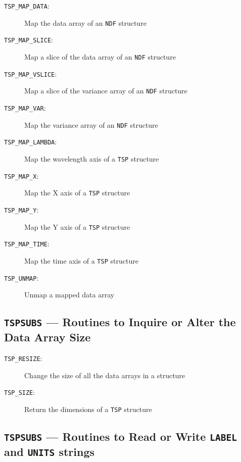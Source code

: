 \documentclass[11pt,twoside,nolof,noabs]{starlink}
\newcommand{\mansection}[2]{\subsection{#1 --- #2}}
\newenvironment{mansectionroutines}{\begin{description}}{\end{description}}
\newcommand{\mansectionitem}[1]{\item[#1:]}
\providecommand{\mantt}[1]{\texttt{#1}}
\begin{document}
\begin{mansectionroutines}
\mansectionitem{{\mantt{TSP\_{}MAP\_{}DATA}}}
     Map the data array of an {\mantt{NDF}} structure

\mansectionitem{{\mantt{TSP\_{}MAP\_{}SLICE}}}
     Map a slice of the data array of an {\mantt{NDF}} structure

\mansectionitem{{\mantt{TSP\_{}MAP\_{}VSLICE}}}
     Map a slice of the variance array of an {\mantt{NDF}} structure

\mansectionitem{{\mantt{TSP\_{}MAP\_{}VAR}}}
     Map the variance array of an {\mantt{NDF}} structure

\mansectionitem{{\mantt{TSP\_{}MAP\_{}LAMBDA}}}
     Map the wavelength axis of a {\mantt{TSP}} structure

\mansectionitem{{\mantt{TSP\_{}MAP\_{}X}}}
     Map the X axis of a {\mantt{TSP}} structure

\mansectionitem{{\mantt{TSP\_{}MAP\_{}Y}}}
     Map the Y axis of a {\mantt{TSP}} structure

\mansectionitem{{\mantt{TSP\_{}MAP\_{}TIME}}}
     Map the time axis of a {\mantt{TSP}} structure

\mansectionitem{{\mantt{TSP\_{}UNMAP}}}
     Unmap a mapped data array

\end{mansectionroutines}
\mansection{{\mantt{TSPSUBS}}}{Routines to Inquire or Alter the Data Array Size}
\begin{mansectionroutines}
\mansectionitem{{\mantt{TSP\_{}RESIZE}}}
     Change the size of all the data arrays in a structure

\mansectionitem{{\mantt{TSP\_{}SIZE}}}
     Return the dimensions of a {\mantt{TSP}} structure

\end{mansectionroutines}
\mansection{{\mantt{TSPSUBS}}}{Routines to Read or Write {\mantt{LABEL}} and {%
\mantt{UNITS}} strings}
\end{document}
